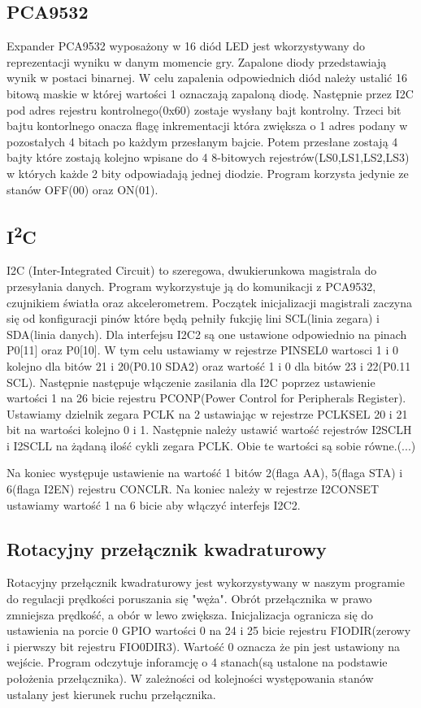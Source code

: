 \documentclass{classrep}
\begin{document}
\subsection{PCA9532}
Expander PCA9532 wyposażony w 16 diód LED jest wkorzystywany do reprezentacji wyniku w danym momencie gry. Zapalone diody przedstawiają wynik w postaci binarnej.
W celu zapalenia odpowiednich diód należy ustalić 16 bitową maskie w której wartości 1 oznaczają zapaloną diodę. Następnie przez I2C pod adres rejestru kontrolnego(0x60)  				zostaje wysłany bajt kontrolny. Trzeci  bit bajtu kontorlnego onacza flagę inkrementacji która zwiększa o 1 adres podany w pozostałych 4 bitach po każdym przesłanym bajcie. 				Potem przesłane zostają 4 bajty które zostają kolejno wpisane do 4  8-bitowych rejestrów(LS0,LS1,LS2,LS3) w których każde 2 bity odpowiadają jednej diodzie. Program korzysta 				jedynie ze stanów OFF(00) oraz ON(01).
\subsection{I\textsuperscript{2}C}
I2C (Inter-Integrated Circuit) to szeregowa, dwukierunkowa magistrala do przesyłania danych. Program wykorzystuje ją do komunikacji z PCA9532, czujnikiem światła oraz 					akcelerometrem.
Początek inicjalizacji magistrali zaczyna się od konfiguracji pinów które będą pełniły fukcjię lini SCL(linia zegara) i SDA(linia danych). Dla interfejsu I2C2 są one ustawione 				odpowiednio na pinach P0[11] oraz P0[10]. W tym celu ustawiamy w rejestrze PINSEL0 wartosci 1 i 0 kolejno dla bitów 21 i 20(P0.10 SDA2) oraz wartość 1 i 0 dla bitów 23 i 22(P0.11 		SCL). Następnie następuje włączenie zasilania dla I2C poprzez ustawienie wartości 1 na 26 bicie rejestru PCONP(Power Control for Peripherals Register). Ustawiamy dzielnik zegara 			PCLK na 2 ustawiając w rejestrze PCLKSEL 20 i 21 bit na wartości kolejno 0 i 1. Następnie należy ustawić wartość rejestrów I2SCLH i I2SCLL na żądaną ilość cykli zegara PCLK. Obie			 	te wartości są sobie równe.(...)
 
Na koniec występuje ustawienie na wartość 1 bitów 2(flaga AA), 5(flaga STA) i 6(flaga I2EN) rejestru CONCLR.
Na koniec należy w rejestrze I2CONSET ustawiamy wartość 1 na 6 bicie aby włączyć interfejs I2C2. 
\subsection{Rotacyjny przełącznik kwadraturowy}
Rotacyjny przełącznik kwadraturowy jest wykorzystywany w naszym programie do regulacji prędkości poruszania się "węża". Obrót przełącznika w prawo zmniejsza prędkość, a obór w lewo zwiększa. Inicjalizacja ogranicza się do ustawienia na porcie 0 GPIO wartości 0 na 24 i 25 bicie rejestru FIODIR(zerowy i pierwszy bit rejestru FIO0DIR3). Wartość 0 oznacza że pin jest ustawiony na wejście. Program odczytuje inforamcję o 4 stanach(są ustalone na podstawie położenia przełącznika). W zależności od kolejności występowania stanów ustalany jest kierunek ruchu przełącznika.
\end{document}
